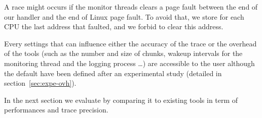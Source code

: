 A race might occurs if the monitor threads clears a page fault between the
end of our handler and the end of Linux page fault. To avoid that, we store
for each CPU the last address that faulted, and we forbid to clear this
address.

Every settings that can influence either the accuracy of the trace or the
overhead of the tools (such as the number and size of chunks, wakeup intervals
for the monitoring thread and the logging process \ldots) are accessible to the
user although the default have been defined after an experimental study
(detailed in section~\ref{sec:expe-ovh}).

In the next section we evaluate \Moca by comparing it to existing tools in
term of performances and trace precision.
